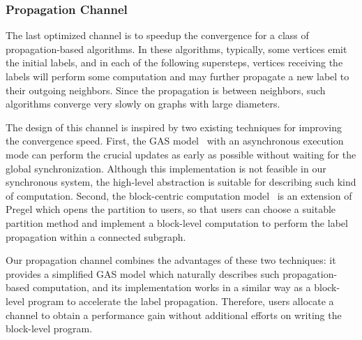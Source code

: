 \documentclass{sokendai_thesis} %
\begin{document}

\subsubsection{Propagation Channel}
\label{sec:propagation}

The last optimized channel is to speedup the convergence for a class of propagation-based algorithms.
In these algorithms, typically, some vertices emit the initial labels, and in each of the following supersteps, vertices receiving the labels will perform some computation and may further propagate a new label to their outgoing neighbors.
Since the propagation is between neighbors, such algorithms converge very slowly on graphs with large diameters.

The design of this channel is inspired by two existing techniques for improving the convergence speed.
First, the GAS model~\cite{powergraph} with an asynchronous execution mode can perform the crucial updates as early as possible without waiting for the global synchronization.
Although this implementation is not feasible in our synchronous system, the high-level abstraction is suitable for describing such kind of computation.
Second, the block-centric computation model~\cite{thinkgraph,yan2014blogel,goffish} is an extension of Pregel which opens the partition to users, so that users can choose a suitable partition method and implement a block-level computation to perform the label propagation within a connected subgraph.

Our propagation channel combines the advantages of these two techniques: it provides a simplified GAS model which naturally describes such propagation-based computation, and its implementation works in a similar way as a block-level program to accelerate the label propagation.
Therefore, users allocate a channel to obtain a performance gain without additional efforts on writing the block-level program.
\end{document}
